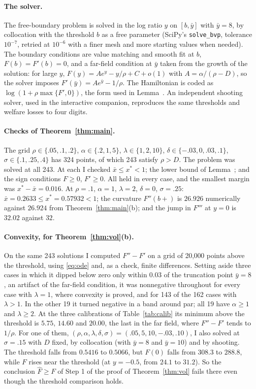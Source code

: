 \paragraph{The solver.} The free-boundary problem is solved in the log ratio $y$ on $[b,\bar y]$ with $\bar y=8$, by collocation with the threshold $b$ as a free parameter (SciPy's \texttt{solve\_bvp}, tolerance $10^{-7}$, retried at $10^{-6}$ with a finer mesh and more starting values when needed). The boundary conditions are value matching and smooth fit at $b$, $F(b)=F'(b)=0$, and a far-field condition at $\bar y$ taken from the growth of the solution: for large $y$, $F(y)=Ae^y-y/\rho+C+o(1)$ with $A=\alpha/(\rho-D)$, so the solver imposes $F'(\bar y)=Ae^{\bar y}-1/\rho$. The Hamiltonian is coded as $\log(1+\rho\max\{F',0\})$, the form used in Lemma~. An independent shooting solver, used in the interactive companion, reproduces the same thresholds and welfare losses to four digits.

\paragraph{Checks of Theorem~\ref{thm:main}.} The grid $\rho\in\{.05,.1,.2\}$, $\alpha\in\{.2,1,5\}$, $\lambda\in\{1,2,10\}$, $\delta\in\{-.03,0,.03,.1\}$, $\sigma\in\{.1,.25,.4\}$ has 324 points, of which 243 satisfy $\rho>D$. The problem was solved at all 243. At each I checked $\bar x\le x^*<1$; the lower bound of Lemma~; and the sign conditions $F\ge0$, $F'\ge0$. All held in every case, and the smallest margin was $x^*-\bar x=0.016$. At $\rho=.1$, $\alpha=1$, $\lambda=2$, $\delta=0$, $\sigma=.25$: $\bar x=0.2633\le x^*=0.57932<1$; the curvature $F''(b+)$ is $26.926$ numerically against $26.924$ from Theorem~\ref{thm:main}(b); and the jump in $F'''$ at $y=0$ is $32.02$ against $32$.

\paragraph{Convexity, for Theorem~\ref{thm:vol}(b).} On the same 243 solutions I computed $F''-F'$ on a grid of 20,000 points above the threshold, using \eqref{eq:ode} and, as a check, finite differences. Setting aside three cases in which it dipped below zero only within $0.03$ of the truncation point $\bar y=8$, an artifact of the far-field condition, it was nonnegative throughout for every case with $\lambda=1$, where convexity is proved, and for 143 of the 162 cases with $\lambda>1$. In the other 19 it turned negative in a band around par; all 19 have $\alpha\ge1$ and $\lambda\ge2$. At the three calibrations of Table~\ref{tab:calib} its minimum above the threshold is $5.75$, $14.60$ and $20.00$, the last in the far field, where $F''-F'$ tends to $1/\rho$. For one of them, $(\rho,\alpha,\lambda,\delta,\sigma)=(.05,5,10,-.03,.10)$, I also solved at $\sigma=.15$ with $D$ fixed, by collocation (with $\bar y=8$ and $\bar y=10$) and by shooting. The threshold falls from $0.5416$ to $0.5066$, but $F(0)$ falls from $308.3$ to $288.8$, while $F$ rises near the threshold (at $y=-0.5$, from $24.1$ to $31.2$). So the conclusion $\hat F\ge F$ of Step 1 of the proof of Theorem~\ref{thm:vol} fails there even though the threshold comparison holds.

